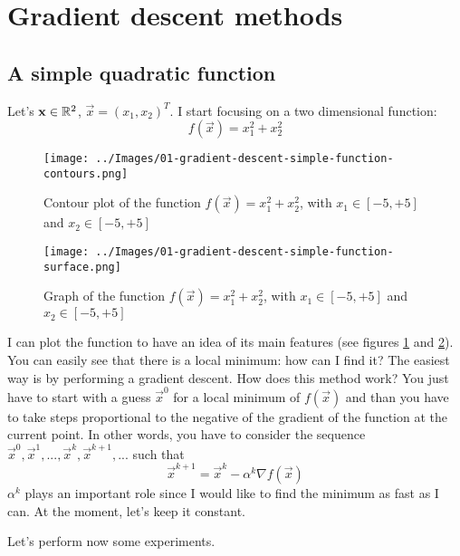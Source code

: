 \section{Gradient descent methods}
    \subsection{A simple quadratic function}
        Let's \(\mathbf{x} \in \mathbb{R}^2\), \(\vec{x} = (x_1, x_2)^T\). I start focusing on a two dimensional function:
        \[f(\vec{x}) = x_1^2 + x_2^2\]
        \begin{figure}
            \centering
            \texttt{[image: ../Images/01-gradient-descent-simple-function-contours.png]}
            \caption{Contour plot of the function \(f(\vec{x}) = x_{1}^{2} + x_{2}^{2}\), with \(x_1 \in [-5, +5]\) and \(x_2 \in [-5, +5]\)}
            \label{gradient-descent-simple-function-contours}
        \end{figure}
        \begin{figure}
            \centering
            \texttt{[image: ../Images/01-gradient-descent-simple-function-surface.png]}
            \caption{Graph of the function \(f(\vec{x}) = x_{1}^{2} + x_{2}^{2}\), with \(x_1 \in [-5, +5]\) and \(x_2 \in [-5, +5]\)}
            \label{gradient-descent-simple-function-surface}
        \end{figure}
        I can plot the function to have an idea of its main features (see figures \ref{gradient-descent-simple-function-contours} and \ref{gradient-descent-simple-function-surface}). You can easily see that there is a local minimum: how can I find it? The easiest way is by performing a gradient descent. How does this method work? You just have to start with a guess \(\vec{x}^0\) for a local minimum of \(f(\vec{x})\) and than you have to take steps proportional to the negative of the gradient of the function at the current point. In other words, you have to consider the sequence \(\vec{x}^0, \vec{x}^1, ..., \vec{x}^k, \vec{x}^{k+1}, ...\) such that
        \[\vec{x}^{k+1} = \vec{x}^k - \alpha^k \nabla f(\vec{x})\]
        \(\alpha^k\) plays an important role since I would like to find the minimum as fast as I can. At the moment, let's keep it constant.\par
        Let's perform now some experiments.
